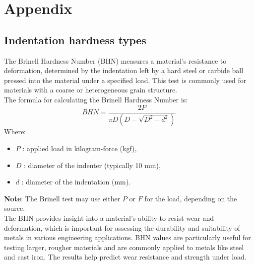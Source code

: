 \documentclass{article}
\begin{document}
    
    
    

    \newpage\vspace*{-5pt}
    
   
    
\section{Appendix}
\normalsize
\renewcommand{\thesubsection}{\Alph{subsection}}

\subsection{Indentation hardness types}
The Brinell Hardness Number (BHN) measures a material's resistance to deformation, determined by the indentation left by a hard steel or carbide ball pressed into the material under a specified load. This test is commonly used for materials with a coarse or heterogeneous grain structure.\\[1em]
The formula for calculating the Brinell Hardness Number is:
\begin{equation}
    BHN = \frac{2P}{\pi D (D - \sqrt{D^2 - d^2})}
\end{equation}
Where:
\begin{itemize}[itemsep=-1mm]
    \item \( P \) : applied load in kilogram-force (kgf),
    \item \( D \) : diameter of the indenter (typically 10 mm),
    \item \( d \) : diameter of the indentation (mm).
\end{itemize}
\textbf{Note}: The Brinell test may use either $P$ or $F$ for the load, depending on the source.\\ 
The BHN provides insight into a material's ability to resist wear and deformation, which is important for assessing the durability and suitability of metals in various engineering applications. BHN values are particularly useful for testing larger, rougher materials and are commonly applied to metals like steel and cast iron. The results help predict wear resistance and strength under load.
\end{document}
